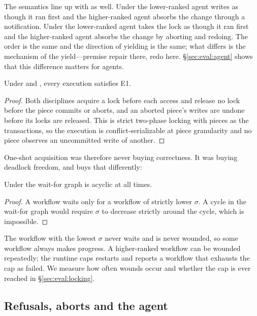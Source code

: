 The semantics line up with \mtpo as well. Under \mtpo the lower-ranked agent
writes as though it ran first and the higher-ranked agent absorbs the change
through a notification. Under \ccs the lower-ranked agent takes the lock as
though it ran first and the higher-ranked agent absorbs the change by aborting
and redoing. The order is the same and the direction of yielding is the same;
what differs is the mechanism of the yield---premise repair there, redo here.
\S\ref{sec:eval:agent} shows that this difference matters for agents.

\begin{proposition}
\label{prop:atomic}
Under \cctwo and \ccs, every execution satisfies E1.
\end{proposition}

\begin{proof}
Both disciplines acquire a lock before each access and release no lock before
the piece commits or aborts, and an aborted piece's writes are undone before
its locks are released. This is strict two-phase locking with pieces as the
transactions, so the execution is conflict-serializable at piece granularity
and no piece observes an uncommitted write of another.
\end{proof}

One-shot acquisition was therefore never buying correctness. It was buying
deadlock freedom, and \ccs buys that differently:

\begin{proposition}
\label{prop:acyclic}
Under \ccs the wait-for graph is acyclic at all times.
\end{proposition}

\begin{proof}
A workflow waits only for a workflow of strictly lower $\sigma$. A cycle in
the wait-for graph would require $\sigma$ to decrease strictly around the
cycle, which is impossible.
\end{proof}

The workflow with the lowest $\sigma$ never waits and is never wounded, so
some workflow always makes progress. A higher-ranked workflow can be wounded
repeatedly; the runtime caps restarts and reports a workflow that exhausts the
cap as failed. We measure how often wounds occur and whether the cap is ever
reached in \S\ref{sec:eval:locking}.

\subsection{Refusals, aborts and the agent}

